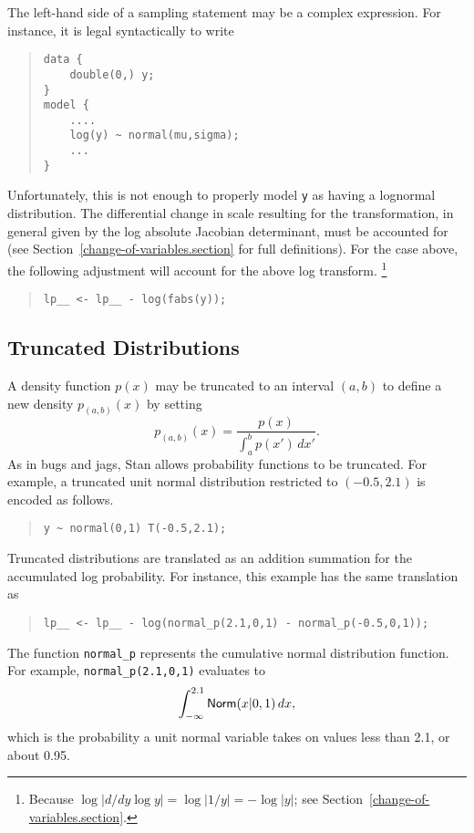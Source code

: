 \documentclass[10pt]{report}
\newcommand{\Stan}{Stan\xspace}
\newcommand{\acronym}[1]{{\sc #1}\xspace}
\newcommand{\BUGS}{\acronym{bugs}}
\newcommand{\JAGS}{\acronym{jags}}
\newcommand{\code}[1]{{\tt #1}}
\newcommand{\refsection}[1]{Section~\ref{#1.section}}
\begin{document}
The left-hand side of a sampling statement may be a complex
expression.  For instance, it is legal syntactically to write
%
\begin{quote}
\begin{Verbatim}
data {
    double(0,) y;
}
model {
    ....
    log(y) ~ normal(mu,sigma);
    ...
}
\end{Verbatim}
\end{quote}
%
Unfortunately, this is not enough to properly model \code{y} as having
a lognormal distribution.  The differential change in scale resulting
for the transformation, in general given by the log absolute Jacobian
determinant, must be accounted for (see
\refsection{change-of-variables} for full definitions).  For the case
above, the following adjustment will account for the above log
transform.%
%
\footnote{Because $\log | d/dy \log y | = \log | 1/y | = - \log
  |y|$;  see \refsection{change-of-variables}.}
%
\begin{quote}
\begin{Verbatim}
lp__ <- lp__ - log(fabs(y));
\end{Verbatim}
\end{quote}
%

\subsection{Truncated Distributions}

A density function $p(x)$ may be truncated to an interval $(a,b)$ to
define a new density $p_{(a,b)}(x)$ by setting
%
\[ 
p_{\!(a,b)\!}(x) = \frac{p(x)}
                  {\int_a^b p(x') \, dx'}.
\] 
As in \BUGS and \JAGS, \Stan allows probability functions to be
truncated.  For example, a truncated unit normal distribution
restricted to $(-0.5,2.1)$ is encoded as follows.
%
\begin{quote}
\begin{Verbatim} 
y ~ normal(0,1) T(-0.5,2.1);
\end{Verbatim}
\end{quote}
% 
Truncated distributions are translated as an addition summation for
the accumulated log probability.  For instance, this example has the
same translation as
%
\begin{quote}
\begin{Verbatim}
lp__ <- lp__ - log(normal_p(2.1,0,1) - normal_p(-0.5,0,1));
\end{Verbatim}
\end{quote}
%
The function \code{normal\_p} represents the cumulative normal
distribution function.  For example, \code{normal\_p(2.1,0,1)} evaluates to 
\[
\int_{-\infty}^{2.1} \mbox{\sf Norm}(x|0,1) \, dx,
\]
%
which is the probability a unit normal variable takes on values less
than 2.1, or about 0.95.
\end{document}
